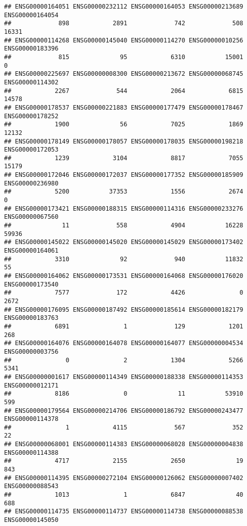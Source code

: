 \documentclass[
]{article}
\begin{document}
\begin{verbatim}
## ENSG00000164051 ENSG00000232112 ENSG00000164053 ENSG00000213689 ENSG00000164054 
##             898            2891             742             508           16331 
## ENSG00000114268 ENSG00000145040 ENSG00000114270 ENSG00000010256 ENSG00000183396 
##             815              95            6310           15001               0 
## ENSG00000225697 ENSG00000008300 ENSG00000213672 ENSG00000068745 ENSG00000114302 
##            2267             544            2064            6815           14578 
## ENSG00000178537 ENSG00000221883 ENSG00000177479 ENSG00000178467 ENSG00000178252 
##            1900              56            7025            1869           12132 
## ENSG00000178149 ENSG00000178057 ENSG00000178035 ENSG00000198218 ENSG00000172053 
##            1239            3104            8817            7055           15179 
## ENSG00000172046 ENSG00000172037 ENSG00000177352 ENSG00000185909 ENSG00000236980 
##            5200           37353            1556            2674               0 
## ENSG00000173421 ENSG00000188315 ENSG00000114316 ENSG00000233276 ENSG00000067560 
##              11             558            4904           16228           59936 
## ENSG00000145022 ENSG00000145020 ENSG00000145029 ENSG00000173402 ENSG00000164061 
##            3310              92             940           11832              55 
## ENSG00000164062 ENSG00000173531 ENSG00000164068 ENSG00000176020 ENSG00000173540 
##            7577             172            4426               0            2672 
## ENSG00000176095 ENSG00000187492 ENSG00000185614 ENSG00000182179 ENSG00000183763 
##            6891               1             129            1201             268 
## ENSG00000164076 ENSG00000164078 ENSG00000164077 ENSG00000004534 ENSG00000003756 
##               0               2            1304            5266            5341 
## ENSG00000001617 ENSG00000114349 ENSG00000188338 ENSG00000114353 ENSG00000012171 
##            8186               0              11           53910             599 
## ENSG00000179564 ENSG00000214706 ENSG00000186792 ENSG00000243477 ENSG00000114378 
##               1            4115             567             352              22 
## ENSG00000068001 ENSG00000114383 ENSG00000068028 ENSG00000004838 ENSG00000114388 
##            4717            2155            2650              19             843 
## ENSG00000114395 ENSG00000272104 ENSG00000126062 ENSG00000007402 ENSG00000088543 
##            1013               1            6847              40             688 
## ENSG00000114735 ENSG00000114737 ENSG00000114738 ENSG00000088538 ENSG00000145050 

\end{verbatim}
\end{document}
